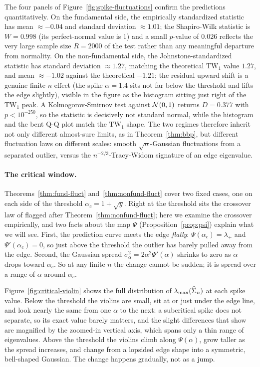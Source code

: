 The four panels of Figure~\ref{fig:spike-fluctuations} confirm the predictions quantitatively. On the fundamental side, the empirically standardized statistic has mean \(\approx -0.04\) and standard deviation \(\approx 1.01\); the Shapiro-Wilk statistic is \(W = 0.998\) (its perfect-normal value is \(1\)) and a small \(p\)-value of \(0.026\) reflects the very large sample size \(R = 2000\) of the test rather than any meaningful departure from normality. On the non-fundamental side, the Johnstone-standardized statistic has standard deviation \(\approx 1.27\), matching the theoretical \(\mathrm{TW}_1\) value \(1.27\), and mean \(\approx -1.02\) against the theoretical \(-1.21\); the residual upward shift is a genuine finite-\(n\) effect (the spike \(\alpha = 1.4\) sits not far below the threshold and lifts the edge slightly), visible in the figure as the histogram sitting just right of the \(\mathrm{TW}_1\) peak. A Kolmogorov-Smirnov test against \(\mathcal{N}(0, 1)\) returns \(D = 0.377\) with \(p < 10^{-250}\), so the statistic is decisively not standard normal, while the histogram and the bent Q-Q plot match the \(\mathrm{TW}_1\) shape. The two regimes therefore inherit not only different almost-sure limits, as in Theorem~\ref{thm:bbp}, but different fluctuation laws on different scales: smooth \(\sqrt{n}\)-Gaussian fluctuations from a separated outlier, versus the \(n^{-2/3}\)-Tracy-Widom signature of an edge eigenvalue.

\paragraph{The critical window.}
Theorems~\ref{thm:fund-fluct} and~\ref{thm:nonfund-fluct} cover two fixed cases, one on each side of the threshold \(\alpha_c = 1 + \sqrt{y}\). Right at the threshold sits the crossover law of \citet{BaikBenArousPeche2005} flagged after Theorem~\ref{thm:nonfund-fluct}; here we examine the crossover empirically, and two facts about the map \(\Psi\) (Proposition~\ref{prop:psi}) explain what we will see. First, the prediction curve meets the edge \emph{flatly}: \(\Psi(\alpha_c) = \lambda_+\) and \(\Psi'(\alpha_c) = 0\), so just above the threshold the outlier has barely pulled away from the edge. Second, the Gaussian spread \(\sigma_\alpha^2 = 2\alpha^2 \Psi'(\alpha)\) shrinks to zero as \(\alpha\) drops toward \(\alpha_c\). So at any finite \(n\) the change cannot be sudden; it is spread over a range of \(\alpha\) around \(\alpha_c\).

Figure~\ref{fig:critical-violin} shows the full distribution of \(\lambda_{\max}(\widehat{\Sigma}_n)\) at each spike value. Below the threshold the violins are small, sit at or just under the edge line, and look nearly the same from one \(\alpha\) to the next: a subcritical spike does not separate, so its exact value barely matters, and the slight differences that show are magnified by the zoomed-in vertical axis, which spans only a thin range of eigenvalues. Above the threshold the violins climb along \(\Psi(\alpha)\), grow taller as the spread increases, and change from a lopsided edge shape into a symmetric, bell-shaped Gaussian. The change happens gradually, not as a jump.

